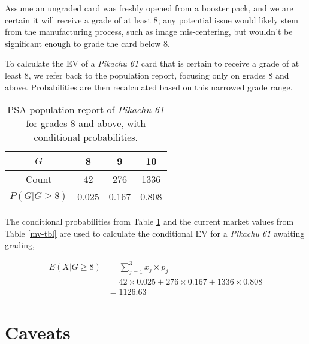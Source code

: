 \documentclass{article}
\begin{document}
Assume an ungraded card was freshly opened from a booster pack, and we are certain it will receive a grade of at least 8; any potential issue would likely stem from the manufacturing process, such as image mis-centering, but wouldn't be significant enough to grade the card below 8.

To calculate the EV of a \textit{Pikachu 61} card that is certain to receive a grade of at least 8, we refer back to the population report, focusing only on grades 8 and above. Probabilities are then recalculated based on this narrowed grade range.

\begin{table}[!h]
    \begin{minipage}{\textwidth}
        \begin{center}
            \begin{tabular}{ |c|c|c|c| } 
                \hline
                $G$ & 8 & 9 & 10 \\
                \hline
                Count & 42 & 276 & 1336 \\
                \hline
                $P(G|G \geq 8)$ & 0.025 & 0.167 & 0.808 \\
                \hline
            \end{tabular}
            \caption{\label{cond-prob-tbl}PSA population report of \textit{Pikachu 61} for grades 8 and above, with conditional probabilities.}
        \end{center}
    \end{minipage}
\end{table}

The conditional probabilities from Table \ref{cond-prob-tbl} and the current market values from Table \ref{mv-tbl} are used to calculate the conditional EV for a \textit{Pikachu 61} awaiting grading,

\begin{align*}
    E(X|G \geq 8) &= \sum_{j = 1}^{3} x_j \times p_j \\
                  &= 42 \times 0.025 + 276 \times 0.167 + 1336 \times 0.808 \\
                  &= 1126.63
\end{align*}

\section{Caveats}
\end{document}
